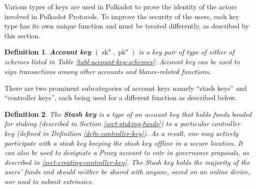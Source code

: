 \documentclass{book}
\newcommand{\tmop}[1]{\ensuremath{\operatorname{#1}}}
\newcommand{\tmstrong}[1]{\textbf{#1}}
\newcommand{\tmtextbf}[1]{{\bfseries{#1}}}
\newtheorem{definition}{Definition}
\providecommand{\tmop}[1]{\ensuremath{\mathrm{#1}}}
\providecommand{\tmstrong}[1]{\tmtextbf{#1}}
\providecommand{\tmtextbf}[1]{\tmtextbf{#1}}
\newtheorem{definition}{Definition}
\begin{document}
Various types of keys are used in Polkadot to prove the identity of the actors
involved in Polkadot Protocols. To improve the security of the users, each key
type has its own unique function and must be treated differently, as described
by this section.

\begin{definition}
  \label{defn-account-key}{\tmstrong{Account key $(\tmop{sk}^a,
  \tmop{pk}^a)$}} is a key pair of type of either of schemes listed in Table
  \ref{tabl-account-key-schemes}:
  {}
  Account key can be used to sign transactions among other accounts and
  blance-related functions.
\end{definition}

There are two prominent subcategories of account keys namely ``stash keys''
and ``controller keys'', each being used for a different function as described
below.

\begin{definition}
  The \label{defn-stash-key}{\tmstrong{Stash key}} is a type of an account key
  that holds funds bonded for staking (described in Section
  \ref{sect-staking-funds}) to a particular controller key (defined in
  Definition \ref{defn-controller-key}). As a result, one may actively
  participate with a stash key keeping the stash key offline in a secure
  location. It can also be used to designate a Proxy account to vote in
  governance proposals, as described in \ref{sect-creating-controller-key}.
  The Stash key holds the majority of the users' funds and should neither be
  shared with anyone, saved on an online device, nor used to submit
  extrinsics.
\end{definition}
\end{document}
